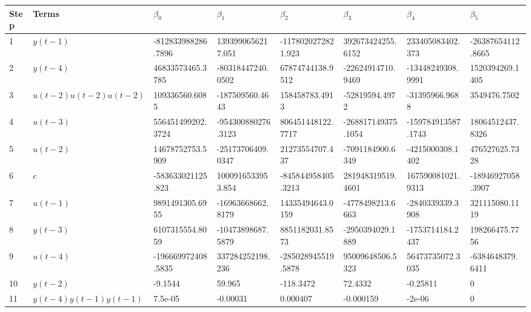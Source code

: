 \begin{tabular}{llllllll}
Step & Terms & $\beta_{0}$ & $\beta_{1}$ & $\beta_{2}$ & $\beta_{3}$ & $\beta_{4}$ & $\beta_{5}$ \\ 
\hline 
1 & $y(t-1)$ & -812833988286.7896 & 1393990656217.051 & -1178020272821.923 & 392673424255.6152 & 233405083402.373 & -26387654112.8665 \\ 
2 & $y(t-4)$ & 46833573465.3785 & -80318447240.0502 & 67874744138.9512 & -22624914710.9469 & -13448249308.9991 & 1520394269.1405 \\ 
3 & $u(t-2)u(t-2)u(t-2)$ & 109336560.6085 & -187509560.4643 & 158458783.4913 & -52819594.4972 & -31395966.9688 & 3549476.7502 \\ 
4 & $u(t-3)$ & 556451499202.3724 & -954300880276.3123 & 806451448122.7717 & -268817149375.1054 & -159784913587.1743 & 18064512437.8326 \\ 
5 & $u(t-2)$ & 14678752753.5909 & -25173706409.0347 & 21273554707.437 & -7091184900.6349 & -4215000308.1402 & 476527625.7328 \\ 
6 & $c$ & -583633021125.823 & 1000916533953.854 & -845844958405.3213 & 281948319519.4601 & 167590081021.9313 & -18946927058.3907 \\ 
7 & $u(t-1)$ & 9891491305.6955 & -16963668662.8179 & 14335494643.0159 & -4778498213.6663 & -2840339339.3908 & 321115080.1119 \\ 
8 & $y(t-3)$ & 6107315554.8059 & -10473898687.5879 & 8851182031.8573 & -2950394029.1889 & -1753714184.2437 & 198266475.7756 \\ 
9 & $u(t-4)$ & -196669972408.5835 & 337284252198.236 & -285028945519.5878 & 95009648506.5323 & 56473735072.3035 & -6384648379.6411 \\ 
10 & $y(t-2)$ & -9.1544 & 59.965 & -118.3472 & 72.4332 & -0.25811 & 0 \\ 
11 & $y(t-4)y(t-1)y(t-1)$ & 7.5e-05 & -0.00031 & 0.000407 & -0.000159 & -2e-06 & 0 \\ 
\hline 
\end{tabular}